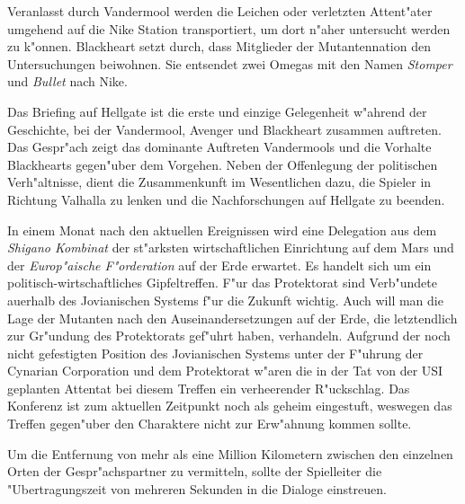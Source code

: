 Veranlasst durch Vandermool werden die Leichen oder verletzten Attent"ater umgehend auf die Nike Station transportiert, um dort n"aher untersucht werden zu k"onnen. Blackheart setzt durch, dass Mitglieder der Mutantennation den Untersuchungen beiwohnen. Sie entsendet zwei Omegas mit den Namen \emph{Stomper} und \emph{Bullet} nach Nike.

\begin{remarks}
	Das Briefing auf Hellgate ist die erste und einzige Gelegenheit w"ahrend der Geschichte, bei der Vandermool, Avenger und Blackheart zusammen auftreten. Das Gespr"ach zeigt das dominante Auftreten Vandermools und die Vorhalte Blackhearts gegen"uber dem Vorgehen. Neben der Offenlegung der politischen Verh"altnisse, dient die Zusammenkunft im Wesentlichen dazu, die Spieler in Richtung Valhalla zu lenken und die Nachforschungen auf Hellgate zu beenden.

	In einem Monat nach den aktuellen Ereignissen wird eine Delegation aus dem \emph{Shigano Kombinat} der st"arksten wirtschaftlichen Einrichtung auf dem Mars und der \emph{Europ"aische F"orderation} auf der Erde erwartet. Es handelt sich um ein politisch-wirtschaftliches Gipfeltreffen. F"ur das Protektorat sind Verb"undete au\3erhalb des Jovianischen Systems f"ur die Zukunft wichtig. Auch will man die Lage der Mutanten nach den Auseinandersetzungen auf der Erde, die letztendlich zur Gr"undung des Protektorats gef"uhrt haben, verhandeln. Aufgrund der noch nicht gefestigten Position des Jovianischen Systems unter der F"uhrung der Cynarian Corporation und dem Protektorat w"aren die in der Tat von der USI geplanten Attentat bei diesem Treffen ein verheerender R"uckschlag. Das Konferenz ist zum aktuellen Zeitpunkt noch als geheim eingestuft, weswegen das Treffen gegen"uber den Charaktere nicht zur Erw"ahnung kommen sollte.

	Um die Entfernung von mehr als eine Million Kilometern zwischen den einzelnen Orten der Gespr"achspartner zu vermitteln, sollte der Spielleiter die "Ubertragungszeit von mehreren Sekunden in die Dialoge einstreuen.
\end{remarks}
